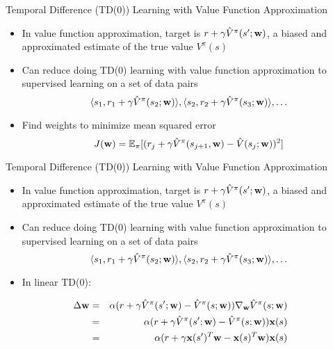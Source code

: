 \documentclass[aspectratio=169]{../latex_main/tntbeamer}  %
\begin{document}
\begin{frame}[c]{Temporal Difference (TD(0)) Learning with Value
		Function Approximation}
	
	\begin{itemize}
		\item In value function approximation, target is $r + \gamma \hat{V}^\pi (s'; \mathbf{w})$, a biased and approximated estimate of the true value $V^\pi(s)$
		\item Can reduce doing TD(0) learning with value function approximation to supervised learning on a set of data pairs
		$$\langle  s_1, r_1+ \gamma \hat{V}^\pi (s_2; \mathbf{w}) \rangle, \langle  s_2, r_2+ \gamma \hat{V}^\pi (s_3; \mathbf{w}) \rangle, \ldots $$
		\item Find weights to minimize mean squared error
		$$J(\mathbf{w}) = \mathbb{E}_\pi [(r_j + \gamma \hat{V}^\pi(s_{j+1}, \mathbf{w}) - \hat{V}(s_j;\mathbf{w}))^2]$$
	\end{itemize}
	
\end{frame}
\begin{frame}[c]{Temporal Difference (TD(0)) Learning with Value
		Function Approximation}
	
	\begin{itemize}
		\item In value function approximation, target is $r + \gamma \hat{V}^\pi (s'; \mathbf{w})$, a biased and approximated estimate of the true value $V^\pi(s)$
		\item Can reduce doing TD(0) learning with value function approximation to supervised learning on a set of data pairs
		$$\langle  s_1, r_1+ \gamma \hat{V}^\pi (s_2; \mathbf{w}) \rangle, \langle  s_2, r_2+ \gamma \hat{V}^\pi (s_3; \mathbf{w}) \rangle, \ldots $$
		\item In linear TD(0):
	\end{itemize}

\begin{eqnarray}
\Delta \mathbf{w} &=& \alpha( r + \gamma \hat{V}^\pi(s'; \mathbf{w}) - \hat{V}^\pi(s;\mathbf{w})) \nabla_{\mathbf{w}} \hat{V}^\pi (s;\mathbf{w})\nonumber\\
&=& \alpha( r + \gamma \hat{V}^\pi(s'; \mathbf{w}) - \hat{V}^\pi(s;\mathbf{w})) \mathbf{x}(s)\nonumber\\
&=& \alpha( r + \gamma \mathbf{x}(s')^T \mathbf{w} - \mathbf{x}(s)^T\mathbf{w}) \mathbf{x}(s)\nonumber
\end{eqnarray}
	
\end{frame}
\end{document}
